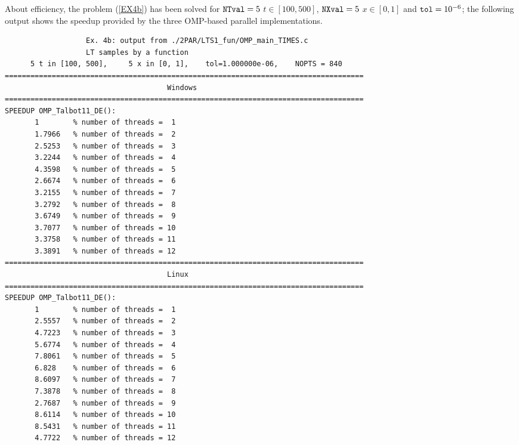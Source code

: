 \documentclass[a4paper,10pt]{report}%
\begin{document}
About efficiency, the problem (\ref{EX4b}) has been solved for ${\tt NTval}=5$ $t\in[100, 500]$,
${\tt NXval}=5$ $x\in[0,1]$ and ${\tt tol}=10^{-6}$; the following output shows the speedup provided by the three
OMP-based parallel implementations.
\begin{lstlisting}
                   Ex. 4b: output from ./2PAR/LTS1_fun/OMP_main_TIMES.c
                   LT samples by a function
      5 t in [100, 500],     5 x in [0, 1],    tol=1.000000e-06,    NOPTS = 840
====================================================================================
                                      Windows
====================================================================================
SPEEDUP OMP_Talbot11_DE():
       1        % number of threads =  1
       1.7966   % number of threads =  2
       2.5253   % number of threads =  3
       3.2244   % number of threads =  4
       4.3598   % number of threads =  5
       2.6674   % number of threads =  6
       3.2155   % number of threads =  7
       3.2792   % number of threads =  8
       3.6749   % number of threads =  9
       3.7077   % number of threads = 10
       3.3758   % number of threads = 11
       3.3891   % number of threads = 12
====================================================================================
                                      Linux
====================================================================================
SPEEDUP OMP_Talbot11_DE():
       1        % number of threads =  1
       2.5557   % number of threads =  2
       4.7223   % number of threads =  3
       5.6774   % number of threads =  4
       7.8061   % number of threads =  5
       6.828    % number of threads =  6
       8.6097   % number of threads =  7
       7.3878   % number of threads =  8
       2.7687   % number of threads =  9
       8.6114   % number of threads = 10
       8.5431   % number of threads = 11
       4.7722   % number of threads = 12


\end{lstlisting}
\end{document}
